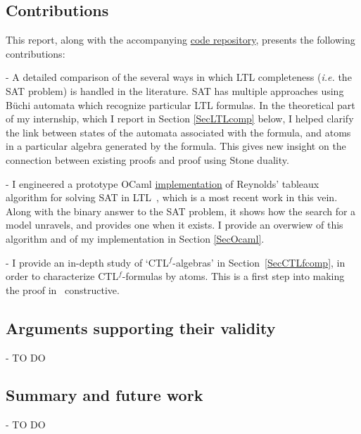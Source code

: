 \documentclass[11pt]{article}
\newcommand{\CTLf}{{CTL$^f$}}
\theoremstyle{definition}
\begin{document}
\subsection*{Contributions}
This report, along with the accompanying \href{https://github.com/anatcaramba/LTL-SAT-Solver-by-Reynolds-Tableaux}{code repository},
presents the following contributions:

- A detailed comparison of the several ways in which
LTL completeness
(\emph{i.e.} the SAT problem) is handled
in the literature. SAT has 
multiple approaches using Büchi automata which recognize particular
LTL formulas. In the theoretical part
of my internship, which I report in Section \ref*{SecLTLcomp} below,
I helped clarify the link between states
of the automata associated with the formula,
and atoms in a particular algebra generated by the formula.
This gives new insight on the connection between existing proofs
and proof using Stone duality.


- I engineered a prototype OCaml \href{https://github.com/anatcaramba/LTL-SAT-Solver-by-Reynolds-Tableaux}{implementation} 
of Reynolds' tableaux
algorithm for solving SAT in LTL~\cite{ReyLTL}, which is a most recent work in this vein.
Along with the binary answer to the SAT problem, it shows how
the search for a model unravels, and provides one when it exists.
I provide an overwiew of this algorithm and of my implementation in 
Section \ref*{SecOcaml}.

- I provide an in-depth study of `{\CTLf}-algebras' in 
Section~\ref*{SecCTLfcomp}, 
in order to characterize
{\CTLf}-formulas by atoms. This is a first step into making the 
proof in~\cite{GhivG16} constructive.



\subsection*{Arguments supporting their validity}
- TO DO



\subsection*{Summary and future work}
- TO DO
\newpage  
\end{document}
